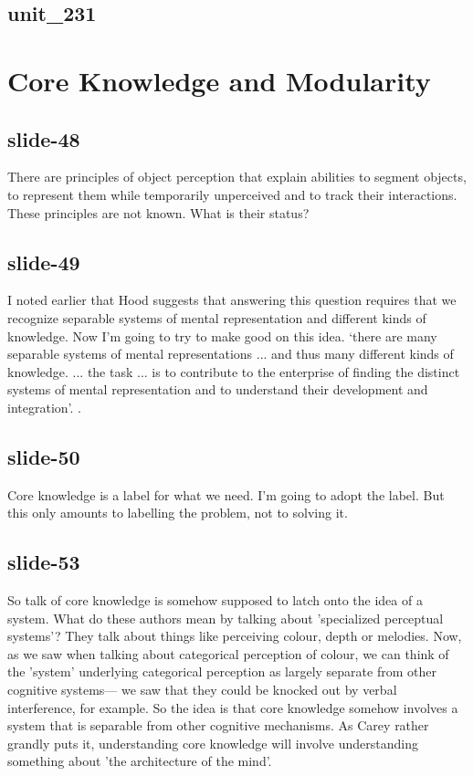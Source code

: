 \documentclass[12pt,\papersize]{extarticle}
\begin{document}
 
\subsection{unit\_231}
 
\section{Core Knowledge and Modularity}
 
 
\subsection{slide-48}
There are principles of object perception that explain abilities to segment objects, to represent them while temporarily unperceived and to track their interactions.
These principles are not known. What is their status?
 
 
\subsection{slide-49}
I noted earlier that Hood suggests that answering this question requires that we recognize separable systems of mental representation and different kinds of knowledge.
Now I'm going to try to make good on this idea.
‘there are many separable systems of mental representations ... and thus many different kinds of knowledge. ... the task ... is to contribute to the enterprise of finding the distinct systems of mental representation and to understand their development and integration’\citep[p.\ 1522]{Hood:2000bf}.
\citep[p.\ 1522]{Hood:2000bf}.
 
 
\subsection{slide-50}
Core knowledge is a label for what we need.
I'm going to adopt the label.
But this only amounts to labelling the problem, not to solving it.
 
 
\subsection{slide-53}
So talk of core knowledge is somehow supposed to latch onto the idea of a system.
What do these authors mean by talking about 'specialized perceptual systems'?
They talk about things like perceiving colour, depth or melodies.
Now, as we saw when talking about categorical perception of colour, we can think of the 'system' underlying categorical perception as largely separate from other cognitive systems--- we saw that they could be knocked out by verbal interference, for example.
So the idea is that core knowledge somehow involves a system that is separable from other cognitive mechanisms.
As Carey rather grandly puts it, understanding core knowledge will involve understanding something about 'the architecture of the mind'.
 
\end{document}
